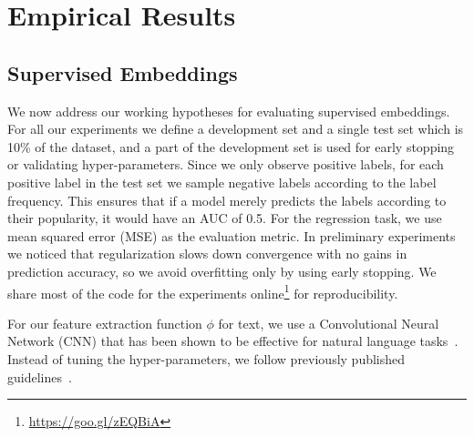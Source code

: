 \documentclass{article}
\renewcommand{\cite}[1]{\citep{#1}}
\begin{document}
\section{Empirical Results}
\label{sec:evaluation}

\subsection{Supervised Embeddings}
\label{sec:targeted embeddings}

We now address our working hypotheses for evaluating supervised embeddings.
For all our experiments we define a development set and a single test set which is 10\% of the dataset, and a part of the development set is used for early stopping or validating hyper-parameters.
Since we  only observe positive labels, for each positive label in the test set we sample negative labels according to the label frequency.
This ensures that if a model merely predicts the labels according to their popularity, it would have an AUC of 0.5.
For the regression task, we use mean squared error (MSE) as the evaluation metric.
In preliminary experiments we noticed that regularization slows down convergence with no gains in prediction accuracy, so we avoid overfitting only by using early stopping.
We share most of the code for the experiments online\footnote{\url{https://goo.gl/zEQBiA}} for reproducibility.

For our feature extraction function $\phi$ for text, we use  a Convolutional Neural Network (CNN) that  has been shown to be effective for natural language tasks~\cite{DBLP:journals/corr/KalchbrennerGB14,tagspace}.
Instead of tuning the hyper-parameters, we follow previously published  guidelines~\cite{zhang2015sensitivity}.
\end{document}
